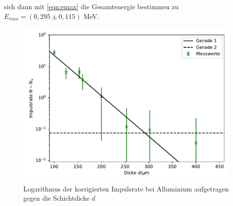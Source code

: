 sich dann mit \autoref{eqn:emax} die Gesamtenergie bestimmen zu $E_{max} = (0,295 \pm 0,115)$ MeV.
\begin{figure}
  \centering
  \includegraphics{Bilder/beta.pdf}
  \caption{Logarithmus der korrigierten Impulsrate bei Alluminium aufgetragen gegen die Schichtdicke $d$}
  \label{fig:Beta}
\end{figure}